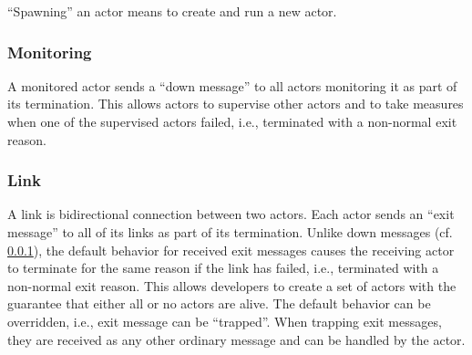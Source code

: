 ``Spawning'' an actor means to create and run a new actor.

\subsubsection{Monitoring}
\label{sec:monitoring}

A monitored actor sends a ``down message'' to all actors monitoring it as part of its termination.
This allows actors to supervise other actors and to take measures when one of the supervised actors failed, i.e., terminated with a non-normal exit reason.

\subsubsection{Link}

A link is bidirectional connection between two actors.
Each actor sends an ``exit message'' to all of its links as part of its termination.
Unlike down messages (cf. \ref{sec:monitoring}), the default behavior for received exit messages causes the receiving actor to terminate for the same reason if the link has failed, i.e., terminated with a non-normal exit reason.
This allows developers to create a set of actors with the guarantee that either all or no actors are alive.
The default behavior can be overridden, i.e., exit message can be ``trapped''.
When trapping exit messages, they are received as any other ordinary message and can be handled by the actor.